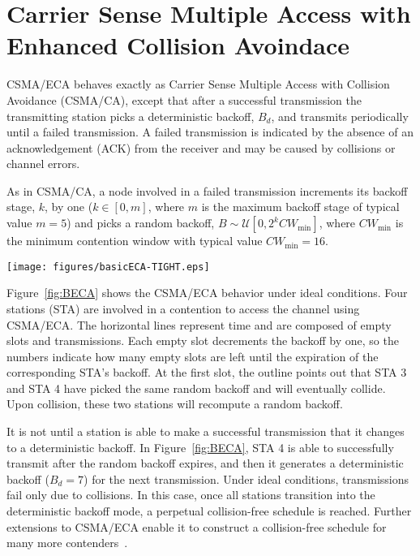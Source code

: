 \documentclass[conference]{IEEEtran}
\begin{document}

\section{Carrier Sense Multiple Access with Enhanced Collision Avoindace}

CSMA/ECA behaves exactly as Carrier Sense Multiple Access with Collision Avoidance (CSMA/CA), except that after a successful transmission the transmitting station picks a deterministic backoff, $B_{d}$, and transmits periodically until a failed transmission. A failed transmission is indicated by the absence of an acknowledgement (ACK) from the receiver and may be caused by collisions or channel errors.

As in CSMA/CA, a node involved in a failed transmission increments its backoff stage, $k$, by one ($k\in[0,m]$, where $m$ is the maximum backoff stage of typical value $m=5$) and picks a random backoff, $B\sim \mathcal{U}[0,2^{k}CW_{\min}]$, where $CW_{\min}$ is the minimum contention window with typical value $CW_{\min}=16$.

	\begin{figure*}[tb]
		\centering
		\texttt{[image: figures/basicECA-TIGHT.eps]}
		\caption{CSMA/ECA with four stations in saturation ($B_{d}=7$).}
		\label{fig:BECA}
	\end{figure*}

Figure~\ref{fig:BECA} shows the CSMA/ECA behavior under ideal conditions. Four stations (STA) are involved in a contention to access the channel using CSMA/ECA. The horizontal lines represent time and are composed of empty slots and transmissions. Each empty slot decrements the backoff by one, so the numbers indicate how many empty slots are left until the expiration of the corresponding STA's backoff. At the first slot, the outline points out that STA 3 and STA 4 have picked the same random backoff and will eventually collide. Upon collision, these two stations will recompute a random backoff.

It is not until a station is able to make a successful transmission that it changes to a deterministic backoff. In Figure~\ref{fig:BECA}, STA 4 is able to successfully transmit after the random backoff expires, and then it generates a deterministic backoff ($B_{d}=7$) for the next transmission. Under ideal conditions, transmissions fail only due to collisions. In this case, once all stations transition into the deterministic backoff mode, a perpetual collision-free schedule is reached. Further extensions to CSMA/ECA enable it to construct a collision-free schedule for many more contenders~\cite{research2standards}.
\end{document}
